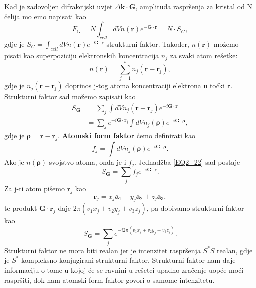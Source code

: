 \documentclass{article}
\numberwithin{equation}{section}
\begin{document}
   Kad je zadovoljen difrakcijski uvjet $\Delta \mathbf{k}\cdot \mathbf{G}$, amplituda raspršenja za kristal od N čelija mo
   emo napisati kao 
   \begin{equation}
       F_G=N\int_{cell}dV n(\mathbf{r})e^{-\mathbf{G\cdot r}}=N\cdot S_G,
       \label{EQ2_20}
   \end{equation}
   gdje je $S_G=\int_{cell}dV n(\mathbf{r})e^{-\mathbf{G\cdot r}}$ strukturni faktor.
   Također, $n(\mathbf{r})$ možemo pisati kao superpoziciju elektronskih koncentracija $n_j$ za svaki atom rešetke:
   \begin{equation}
       n(\mathbf{r})=\sum_{j=1}^s n_j(\mathbf{r-r_j}),
       \label{EQ2_21}
   \end{equation}
   gdje je $n_j(\mathbf{r-r_j})$ doprinos j-tog atoma koncentraciji elektrona u točki \textbf{r}. Strukturni faktor sad možemo zapisati kao 
   \begin{equation}
   \begin{split}
       S_{\mathbf{G}}&=\sum_j \int dV n_j(\mathbf{r}- \mathbf{r}_j) e^{-i\mathbf{G}\cdot \mathbf{r}}\\
       &= \sum_j e^{-i\mathbf{G}\cdot \mathbf{r}_j}\int dV n_j(\mathbf{\rho}) e^{-i\mathbf{G}\cdot \mathbf{\rho}},
   \end{split}
       \label{EQ2_22}
   \end{equation}
gdje je $\mathbf{\rho}=\mathbf{r}-\mathbf{r}_j$. \textbf{Atomski form faktor} ćemo definirati kao 
\begin{equation}
   f_j = \int dV n_j(\mathbf{\rho})e^{-i\mathbf{G}\cdot \mathbf{\rho}}.
    \label{EW2_23}
\end{equation}
Ako je $n(\mathbf{\rho})$ svojstvo atoma, onda je i $f_j$. Jednadžba \ref{EQ2_22} sad postaje
\begin{equation}
    S_{\mathbf{G}}=\sum_j f_j e^{-i\mathbf{G}\cdot \mathbf{r}}.
    \label{EQ2_24}
\end{equation}
   Za j-ti atom pišemo $\mathbf{r}_j$ kao 
   \begin{equation*}
       \mathbf{r}_j = x_j \mathbf{a}_1 + y_j \mathbf{a}_2 + z_j \mathbf{a}_3,
   \end{equation*}
   te produkt $\mathbf{G \cdot r}_j$ daje $2\pi(v_1 x_j + v_2 y_j + v_3 z_j)$, pa dobivamo strukturni faktor kao
   \begin{equation}
       S_{\mathbf{G}}=\sum_j e^{-i 2 \pi (v_1 x_j + v_2 y_j + v_3 z_j)}.
       \label{EQ2_25}
   \end{equation}
   Strukturni faktor ne mora biti realan jer je intenzitet raspršenja $S^*S$ realan, gdje je $S^*  $ kompleksno konjugirani strukturni faktor. Strukturni faktor nam daje informaciju o tome u kojoj će se ravnini u rešetci upadno zračenje uopće moći raspršiti, dok nam atomski form faktor govori o samome intenzitetu. 
   
\end{document}
